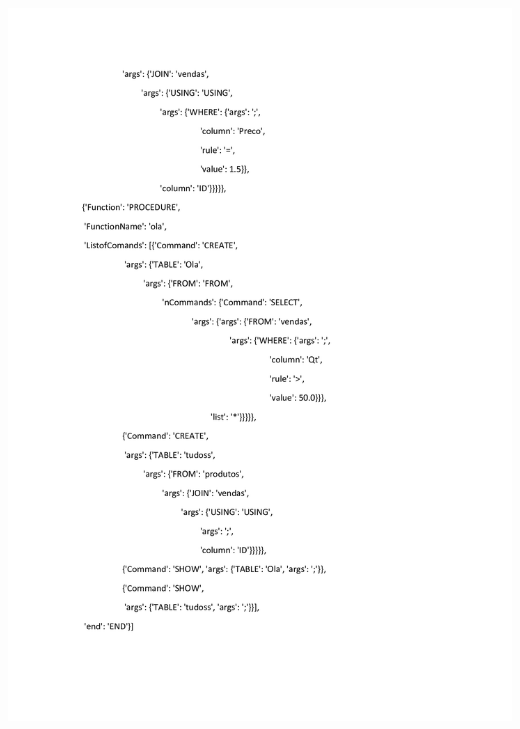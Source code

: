\documentclass{article}
\begin{document}
\noindent
\includegraphics[width=1.3\textwidth]{2}
\end{document}
